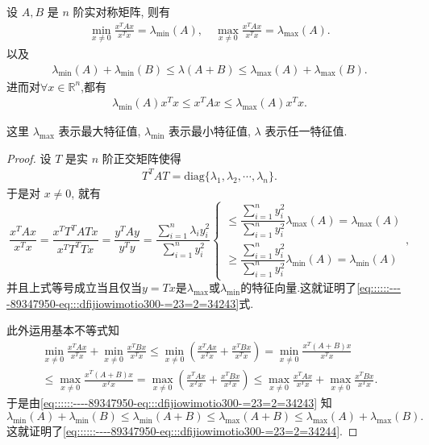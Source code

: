 \documentclass[../../main.tex]{subfiles}%
\begin{document}
\begin{proposition}\label{proposition:Rayleigh-quotient瑞丽商的基本性质}
设 \( A, B \) 是 \( n \) 阶实对称矩阵, 则有
\begin{align}
\min_{x \neq 0} \frac{x^T A x}{x^T x} = \lambda_{\min}(A),\quad \max_{x \neq 0} \frac{x^T A x}{x^T x} = \lambda_{\max}(A). \label{eq::::::----89347950-eq:::dfijiowimotio300-=23=2=34243}
\end{align}
以及
\begin{align}
\lambda_{\min}(A) + \lambda_{\min}(B) \leqslant \lambda(A + B) \leqslant \lambda_{\max}(A) + \lambda_{\max}(B). \label{eq::::::----89347950-eq:::dfijiowimotio300-=23=2=34244}
\end{align}
进而对$\forall x\in \mathbb{R}^n$,都有
\begin{align*}
\lambda_{\min}(A)x^Tx \leqslant x^TAx\leqslant \lambda_{\max}(A)x^Tx.
\end{align*}
\end{proposition}
\begin{note}
这里 \( \lambda_{\max} \) 表示最大特征值, \( \lambda_{\min} \) 表示最小特征值, \( \lambda \) 表示任一特征值.
\end{note}
\begin{proof}
设 \( T \) 是实 \( n \) 阶正交矩阵使得
\begin{align*}
T^T A T = \text{diag} \{ \lambda_1, \lambda_2, \cdots, \lambda_n \} .
\end{align*}
于是对 \( x \neq 0 \), 就有
\[
\frac{x^T A x}{x^T x} = \frac{x^T T^T A T x}{x^T T^T T x} = \frac{y^T A  y}{y^T y} = \frac{\sum\limits_{i=1}^n \lambda_i y_i^2}{\sum\limits_{i=1}^n y_i^2}
\begin{cases} 
\leqslant \dfrac{\sum\limits_{i=1}^n y_i^2}{\sum\limits_{i=1}^n y_i^2} \lambda_{\max}(A)=\lambda_{\max}(A)  \\
\geqslant \dfrac{\sum\limits_{i=1}^n y_i^2}{\sum\limits_{i=1}^n y_i^2} \lambda_{\min}(A)=\lambda_{\min}(A)
\end{cases},
\]
并且上式等号成立当且仅当$y=Tx$是$\lambda_{\text{max}}$或$\lambda_{\text{min}}$的特征向量.这就证明了\eqref{eq::::::----89347950-eq:::dfijiowimotio300-=23=2=34243}式.

此外运用基本不等式知
\begin{gather*}
\min_{x\ne 0} \frac{x^TAx}{x^Tx}+\min_{x\ne 0} \frac{x^TBx}{x^Tx}\leqslant \min_{x\ne 0} \left( \frac{x^TAx}{x^Tx}+\frac{x^TBx}{x^Tx} \right) = \min_{x\ne 0} \frac{x^T(A+B)x}{x^Tx}
\\
\leqslant \max_{x\ne 0} \frac{x^T(A+B)x}{x^Tx}= \max_{x\ne 0} \left( \frac{x^TAx}{x^Tx}+\frac{x^TBx}{x^Tx} \right) \leqslant \max_{x\ne 0} \frac{x^TAx}{x^Tx}+\max_{x\ne 0} \frac{x^TBx}{x^Tx}.
\end{gather*}
于是由\eqref{eq::::::----89347950-eq:::dfijiowimotio300-=23=2=34243} 知
\[
\lambda_{\min}(A) + \lambda_{\min}(B) \leqslant \lambda_{\min}(A + B) \leqslant \lambda_{\max}(A + B) \leqslant \lambda_{\max}(A) + \lambda_{\max}(B).
\]
这就证明了\eqref{eq::::::----89347950-eq:::dfijiowimotio300-=23=2=34244}.
\end{proof}
\end{document}
